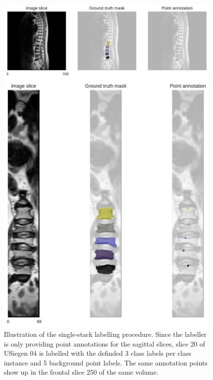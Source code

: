 \begin{figure}
    \centering
    \centering
    \begin{minipage}{.75\textwidth}
        \includegraphics[width=.99\textwidth]{images/USiegen004_s20_points.pdf}
    \end{minipage} 
    \vspace{1 mm}
    \begin{minipage}{.60\textwidth}
        \includegraphics[width=.99\textwidth]{images/USiegen004_s250_front_points.pdf}
    \end{minipage} 
    \vspace{2 mm}
    \caption{Illustration of the single-stack labelling procedure.
    Since the labeller is only providing point annotations for the sagittal slices, slice 20 of USiegen 04 is labelled with the definded 3 class labels per class instance and 5 background point labels.
    The same annotation points show up in the frontal slice 250 of the same volume. 
    \protect\label{fig:inferepoints_2}}
\end{figure}


